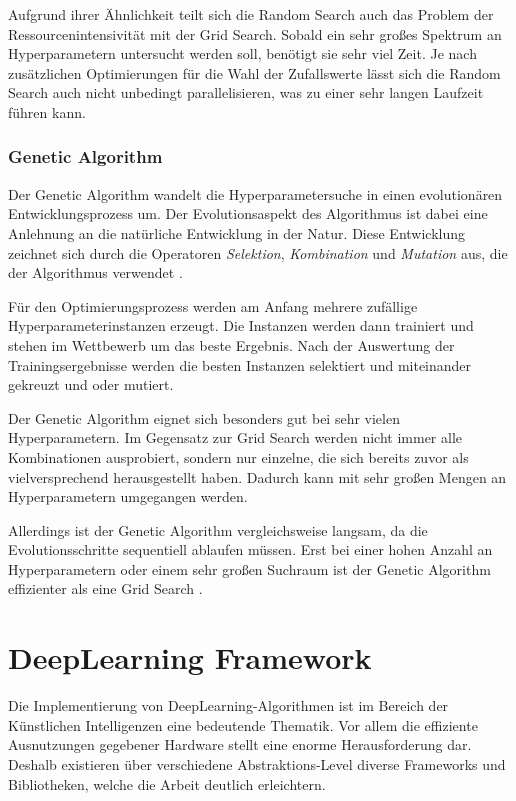 Aufgrund ihrer Ähnlichkeit teilt sich die Random Search auch das Problem der Ressourcenintensivität mit der Grid Search.
Sobald ein sehr großes Spektrum an Hyperparametern untersucht werden soll, benötigt sie sehr viel Zeit.
Je nach zusätzlichen Optimierungen für die Wahl der Zufallswerte lässt sich die Random Search auch nicht unbedingt parallelisieren, was zu einer sehr langen Laufzeit führen kann.

\subsubsection{Genetic Algorithm}
Der Genetic Algorithm \cite{hyperparameters-genetic-algorithm} wandelt die Hyperparametersuche in einen evolutionären Entwicklungsprozess um.
Der Evolutionsaspekt des Algorithmus ist dabei eine Anlehnung an die natürliche Entwicklung in der Natur.
Diese Entwicklung zeichnet sich durch die Operatoren \textit{Selektion}, \textit{Kombination} und \textit{Mutation} aus, die der Algorithmus verwendet .
\newline

Für den Optimierungsprozess werden am Anfang mehrere zufällige Hyperparameterinstanzen erzeugt.
Die Instanzen werden dann trainiert und stehen im Wettbewerb um das beste Ergebnis.
Nach der Auswertung der Trainingsergebnisse werden die besten Instanzen selektiert und miteinander gekreuzt und oder mutiert.
\newline

Der Genetic Algorithm eignet sich besonders gut bei sehr vielen Hyperparametern.
Im Gegensatz zur Grid Search werden nicht immer alle Kombinationen ausprobiert, sondern nur einzelne, die sich bereits zuvor als vielversprechend herausgestellt haben.
Dadurch kann mit sehr großen Mengen an Hyperparametern umgegangen werden.
\newline

Allerdings ist der Genetic Algorithm vergleichsweise langsam, da die Evolutionsschritte sequentiell ablaufen müssen.
Erst bei einer hohen Anzahl an Hyperparametern oder einem sehr großen Suchraum ist der Genetic Algorithm effizienter als eine Grid Search \cite{hyperparameters-search-comparison-focus-genetic}.

\section{DeepLearning Framework}
Die Implementierung von DeepLearning-Algorithmen ist im Bereich der Künstlichen Intelligenzen eine bedeutende Thematik.
Vor allem die effiziente Ausnutzungen gegebener Hardware stellt eine enorme Herausforderung dar. 
Deshalb existieren über verschiedene Abstraktions-Level diverse Frameworks und Bibliotheken, welche die Arbeit deutlich erleichtern.
\newline

